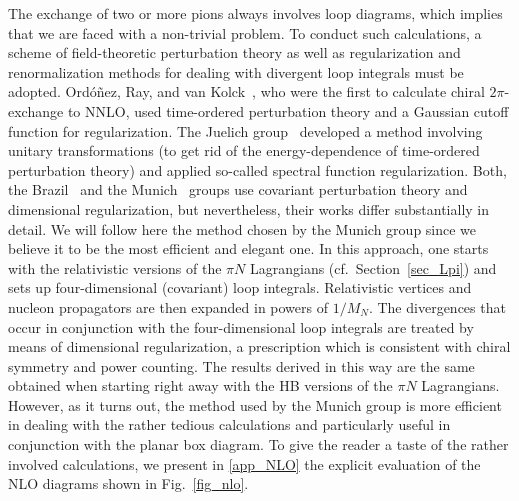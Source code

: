 \documentclass[sort&compress,preprint,3p]{elsarticle}
\begin{document}
The exchange of two or more pions always
involves loop diagrams,
which implies that we are faced with a non-trivial problem.
To conduct such calculations, a scheme of field-theoretic
perturbation theory as well as regularization and renormalization
methods for dealing with divergent loop integrals
must be adopted.
Ord\'o\~nez, Ray, and van Kolck~\cite{ORK94,ORK96},
who were the first to calculate chiral $2\pi$-exchange
to NNLO, used 
time-ordered perturbation theory 
and a Gaussian
cutoff function for regularization.
The Juelich group~\cite{Epe06}
developed a method involving
unitary transformations (to get rid of the energy-dependence
of time-ordered perturbation theory) and applied
so-called spectral function regularization.
Both, the Brazil~\cite{RR94,RR03} and the 
Munich~\cite{KBW97,Kai01a,Kai01b}
groups
use covariant perturbation theory
and dimensional regularization, but nevertheless, their works
differ substantially in detail.
We will follow here the method chosen by the Munich group
since we believe it to be the most efficient and elegant one.
In this approach, one starts
with the relativistic versions of the $\pi N$ Lagrangians
(cf.\ Section~\ref{sec_Lpi}) and sets up four-dimensional
(covariant) loop integrals.
Relativistic vertices and nucleon propagators are then 
expanded in powers of $1/M_N$. 
The divergences that occur in conjunction with the four-dimensional
loop integrals are treated by means of dimensional regularization,
a prescription which is
consistent with chiral symmetry and power counting.
The results derived in this way
are the same obtained when starting right away
with the HB versions of the $\pi N$ Lagrangians.
However, as it turns out, the method used by
the Munich group is more efficient in dealing 
with the rather tedious calculations and particularly
useful in conjunction with the planar box diagram.
To give the reader a taste of the rather involved calculations, 
we present in \ref{app_NLO} the explicit evaluation of
the NLO diagrams shown in Fig.~\ref{fig_nlo}.
\end{document}
